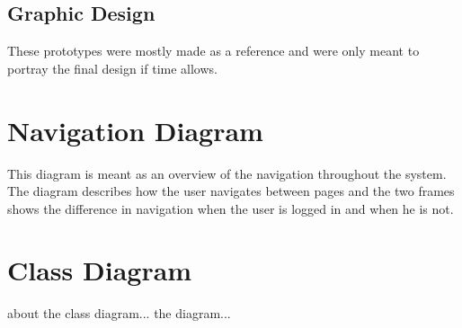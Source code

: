 \documentclass[paper=a4, fontsize=11pt]{scrartcl} %
\numberwithin{equation}{section} %
\numberwithin{figure}{section} %
\numberwithin{table}{section} %
\begin{document}
\subsection{Graphic Design}
These prototypes were mostly made as a reference and were only meant to portray the final design if time allows.
\begin{center}
\end{center}

\section{Navigation Diagram}
This diagram is meant as an overview of the navigation throughout the system. The diagram describes how the user navigates between pages and the two frames shows the difference in navigation when the user is logged in and when he is not.
\begin{center}
\end{center}

\section{Class Diagram}
about the class diagram...
the diagram...
\end{document}
